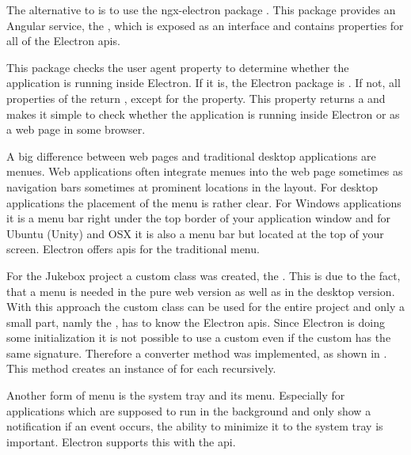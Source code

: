 
The alternative to  is to use the ngx-electron package \cite{ngxElectron}. This package provides an Angular service, the , which is exposed as an interface and contains properties for all of the Electron \gls{api}s.

This package checks the user agent property to determine whether the application is running inside Electron. If it is, the Electron package is . If not, all properties of the  return , except for the  property. This property returns a  and makes it simple to check whether the application is running inside Electron or as a web page in some browser.


A big difference between web pages and traditional desktop applications are menues. Web applications often integrate menues into the web page sometimes as navigation bars sometimes at prominent locations in the layout. For desktop applications the placement of the menu is rather clear. For Windows applications it is a menu bar right under the top border of your application window and for Ubuntu (Unity) and OSX it is also a menu bar but located at the top of your screen. Electron offers \gls{api}s for the traditional menu.



For the Jukebox project a custom  class was created, the . This is due to the fact, that a menu is needed in the pure web version as well as in the desktop version. With this approach the custom class can be used for the entire project and only a small part, namly the , has to know the Electron \gls{api}s. Since Electron is doing some initialization it is not possible to use a custom  even if the custom  has the same signature. Therefore a converter method was implemented, as shown in . This method creates an instance of  for each  recursively.



Another form of menu is the system tray and its menu. Especially for applications which are supposed to run in the background and only show a notification if an event occurs, the ability to minimize it to the system tray is important. Electron supports this with the  \gls{api}.

